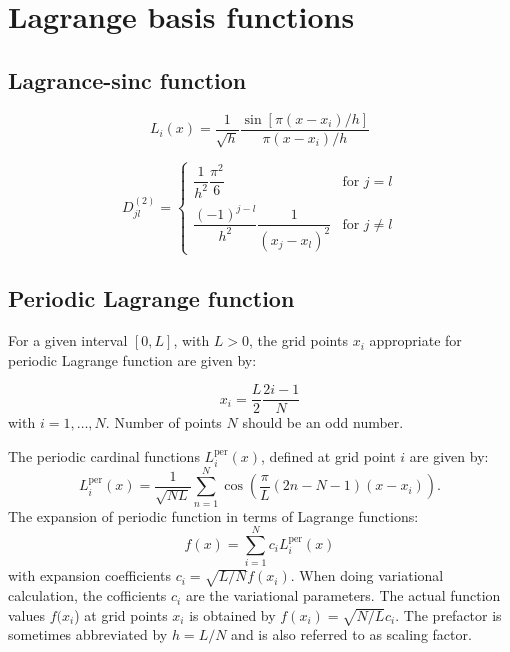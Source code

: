 \chapter{Lagrange basis functions}

\section{Lagrance-sinc function}

\begin{equation}
L_{i}(x) = \frac{1}{\sqrt{h}} \frac{\sin\left[\pi(x-x_{i})/h\right]}
{\pi(x-x_{i})/h}
\end{equation}

\begin{equation}
D^{(2)}_{jl} = \begin{cases}
\dfrac{1}{h^2} \dfrac{\pi^2}{6} & \text{for } j=l \\[10pt]
\dfrac{(-1)^{j-l}}{h^2} \dfrac{1}{(x_{j} - x_{l})^2} & \text{for } j \neq l
\end{cases}
\end{equation}

\section{Periodic Lagrange function}

For a given interval $[0,L]$, with $L>0$, the grid points $x_{i}$
appropriate for periodic Lagrange function are given by:

\begin{equation}
x_{i}=\frac{L}{2}\frac{2i-1}{N}
\end{equation}
with $i=1,\ldots,N$. Number of points $N$ should be an odd number.

The periodic cardinal functions $L_{i}^{\mathrm{per}}(x)$, defined
at grid point $i$ are given by:
\begin{equation}
L_{i}^{\mathrm{per}}(x)=\frac{1}{\sqrt{NL}}\sum_{n=1}^{N}\cos\left(\frac{\pi}{L}(2n-N-1)(x-x_{i})\right).
\end{equation}
The expansion of periodic function in terms of Lagrange functions:
\begin{equation}
f(x)=\sum_{i=1}^{N}c_{i}L_{i}^{\mathrm{per}}(x)
\end{equation}
with expansion coefficients $c_{i}=\sqrt{L/N}f(x_{i})$. When doing
variational calculation, the cofficients $c_{i}$ are the variational
parameters. The actual function values $f(x_{i}$) at grid points
$x_{i}$ is obtained by $f(x_{i})=\sqrt{N/L}c_{i}$. The prefactor
is sometimes abbreviated by $h=L/N$ and is also referred to as scaling
factor.

